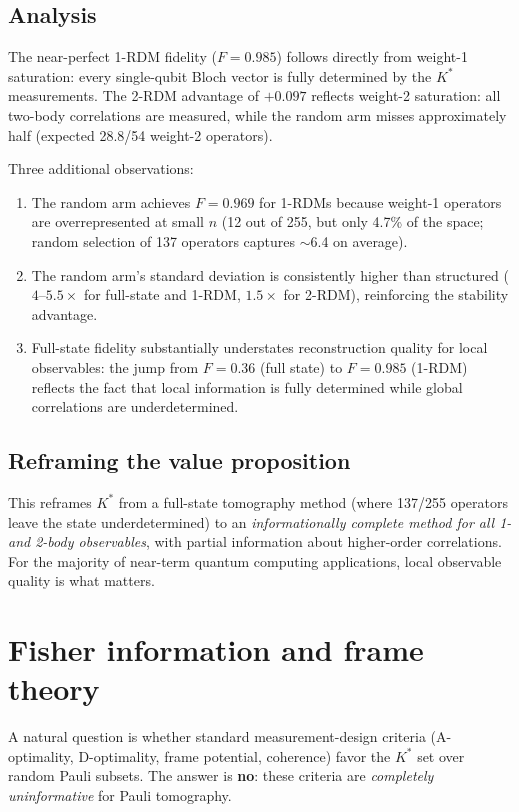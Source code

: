\documentclass[twocolumn,prx,aps,superscriptaddress,longbibliography,floatfix]{revtex4-2}
\begin{document}
\subsection{Analysis}

The near-perfect 1-RDM fidelity ($F = 0.985$) follows directly
from weight-1 saturation: every single-qubit Bloch vector is fully
determined by the $K^*$ measurements.  The 2-RDM advantage of
$+0.097$ reflects weight-2 saturation: all two-body correlations
are measured, while the random arm misses approximately half
(expected 28.8/54 weight-2 operators).

Three additional observations:
\begin{enumerate}
\item The random arm achieves $F = 0.969$ for 1-RDMs because
weight-1 operators are overrepresented at small $n$ (12 out of 255,
but only 4.7\% of the space; random selection of 137 operators
captures $\sim$6.4 on average).
\item The random arm's standard deviation is consistently higher
than structured ($4$--$5.5\times$ for full-state and 1-RDM,
$1.5\times$ for 2-RDM), reinforcing the stability advantage.
\item Full-state fidelity substantially understates reconstruction
quality for local observables: the jump from $F = 0.36$ (full
state) to $F = 0.985$ (1-RDM) reflects the fact that local
information is fully determined while global correlations are
underdetermined.
\end{enumerate}

\subsection{Reframing the value proposition}

This reframes $K^*$ from a full-state tomography method (where
137/255 operators leave the state underdetermined) to an
\emph{informationally complete method for all 1- and 2-body
observables}, with partial information about higher-order
correlations.  For the majority of near-term quantum computing
applications, local observable quality is what matters.


\section{Fisher information and frame theory}
\label{sec:fisher}

A natural question is whether standard measurement-design criteria
(A-optimality, D-optimality, frame potential, coherence) favor the
$K^*$ set over random Pauli subsets.  The answer is \textbf{no}:
these criteria are \emph{completely uninformative} for Pauli
tomography.
\end{document}

